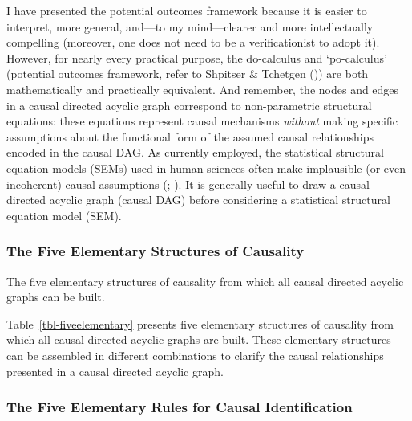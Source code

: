 \documentclass[
  single column]{article}
\begin{document}
I have presented the potential outcomes framework because it is easier
to interpret, more general, and---to my mind---clearer and more
intellectually compelling (moreover, one does not need to be a
verificationist to adopt it). However, for nearly every practical
purpose, the do-calculus and `po-calculus' (potential outcomes
framework, refer to Shpitser \& Tchetgen
()) are both mathematically and
practically equivalent. And remember, the nodes and edges in a causal
directed acyclic graph correspond to non-parametric structural
equations: these equations represent causal mechanisms \emph{without}
making specific assumptions about the functional form of the assumed
causal relationships encoded in the causal DAG. As currently employed,
the statistical structural equation models (SEMs) used in human sciences
often make implausible (or even incoherent) causal assumptions
(;
). It is generally
useful to draw a causal directed acyclic graph (causal DAG) before
considering a statistical structural equation model (SEM).

\subsubsection{The Five Elementary Structures of
Causality}\label{the-five-elementary-structures-of-causality}

\begin{table}

\caption{\label{tbl-fiveelementary}The five elementary structures of
causality from which all causal directed acyclic graphs can be built.}

\centering{

\terminologydirectedgraph

}

\end{table}%

Table~\ref{tbl-fiveelementary} presents five elementary structures of
causality from which all causal directed acyclic graphs are built. These
elementary structures can be assembled in different combinations to
clarify the causal relationships presented in a causal directed acyclic
graph.

\newpage{}

\subsubsection{The Five Elementary Rules for Causal
Identification}\label{the-five-elementary-rules-for-causal-identification}
\end{document}
